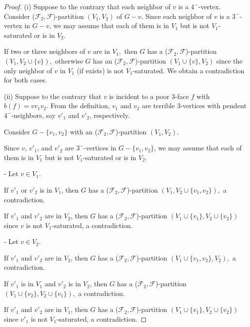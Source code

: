 \documentclass[11pt]{amsart} %
\theoremstyle{definition}
\begin{document}
\begin{proof} 
	
	\noindent (i)  Suppose to the contrary that 
	each neighbor of $v$ is a $4^-$-vertex. 
	Consider ($\mathcal{F}_2,\mathcal{F}$)-partition $(V_1,V_2)$ 
	of $G-v.$ 
	Since each neighbor of $v$ is a $3^-$-vertex in $G-v$, 
	we may assume that each of them is in $V_1$ 
	but is not $V_1$-saturated or is in $V_2.$    
	
	If two or three neighbors of $v$ are in $V_1,$ 
	then $G$ has a ($\mathcal{F}_2,\mathcal{F}$)-partition 
	$(V_1,V_2\cup \{v\}),$ 
	otherwise  $G$ has an ($\mathcal{F}_2,\mathcal{F}$)-partition $(V_1\cup \{v\},V_2)$ since the only neighbor of $v$ in $V_1$ 
	(if exists) is not $V_1$-saturated. 
	We obtain a contradiction for both cases.
	
    (ii)  Suppose to the contrary that $v$ is incident 
    to a poor $3$-face $f$ with $b(f)= vv_1v_2.$ 
    From the definition, $v_1$ and  $v_2$ are terrible 
    $3$-vertices with pendent $4^-$-neighbors, 
    say $v'_1$ and  $v'_2$, respectively. 
	
	Consider $G-\{v_1,v_2\}$ with an  ($\mathcal{F}_2,\mathcal{F}$)-partition $(V_1,V_2).$  
	
	Since $v$, $v'_1$, and $v'_2$ are $3^-$-vertices in $G-\{v_1,v_2\}$, 
	we may assume that each of them is in $V_1$ 
	but is not $V_1$-saturated or is in $V_2.$  
	
	-	Let $v\in V_1$. 
	
	If $v'_1$ or $v'_2$ is in $V_1$, 
	then $G$ has a ($\mathcal{F}_2,\mathcal{F}$)-partition
	$(V_1,V_2\cup\{v_1,v_2\}),$  a contradiction.
	
	If $v'_1$ and $v'_2$ are in $V_2$, 
	then $G$ has a ($\mathcal{F}_2,\mathcal{F}$)-partition 
	$(V_1\cup\{v_1\},V_2\cup\{v_2\})$ 
	since $v$ is not $V_1$-saturated, a contradiction.
	
	
	-	Let $v\in V_2$. 
	
	If $v'_1$ and $v'_2$ are in $V_2$, then $G$ has a ($\mathcal{F}_2,\mathcal{F}$)-partition $(V_1\cup\{v_1,v_2\},V_2),$  a contradiction.
	
	If $v'_1$ is in $V_1$ and $v'_2$ is in $V_2$, 
	then $G$ has a ($\mathcal{F}_2,\mathcal{F}$)-partition 
	$(V_1\cup\{v_2\},V_2\cup\{v_1\}),$ a contradiction.
	
	If $v'_1$ and $v'_2$ are in $V_1$, 
	then $G$ has a ($\mathcal{F}_2,\mathcal{F}$)-partition 
	$(V_1\cup\{v_1\},V_2\cup\{v_2\})$ 
	since $v'_1$ is not $V_1$-saturated, a contradiction. 
	

\end{proof}
\end{document}
